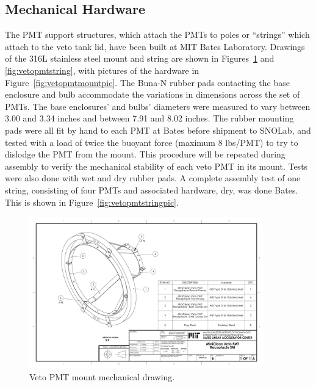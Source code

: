 \documentclass{JINST}
\begin{document}


\subsection{Mechanical Hardware}
%
The PMT support structures, which attach the PMTs to poles or
``strings'' which attach to the veto tank lid, have been built at
MIT Bates Laboratory. Drawings of the 316L stainless steel
mount and string are shown in Figures~\ref{fig:vetopmtmount} and
\ref{fig:vetopmtstring}, with pictures of the hardware in
Figure~\ref{fig:vetopmtmountpic}. The Buna-N rubber pads contacting
the base enclosure and bulb accommodate the variations in dimensions
across the set of PMTs. The base enclosures' and bulbs' diameters were
measured to vary between 3.00 and 3.34 inches and between 7.91 and
8.02 inches. The rubber mounting pads were all fit by hand to each PMT
at Bates before shipment to SNOLab, and tested with a load of twice
the buoyant force (maximum 8 lbs/PMT) to try to dislodge the PMT from
the mount.  This procedure will be repeated during assembly to verify
the mechanical stability of each veto PMT in its mount.  Tests were
also done with wet and dry rubber pads.  A complete assembly test of
one string, consisting of four PMTs and associated hardware, dry, was done
Bates.  This is shown in Figure~\ref{fig:vetopmtstringpic}.

\begin{figure}[ht]
\begin{center}
\includegraphics[width=4in,angle=0]{graphics/vetopmtmount.pdf}
\caption{Veto PMT mount mechanical drawing.
\label{fig:vetopmtmount}}
\end{center}
\end{figure}
\end{document}

